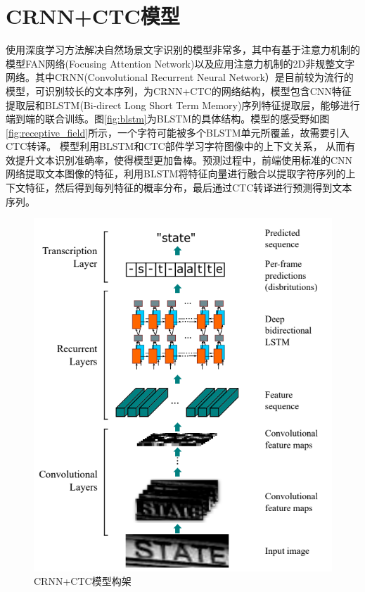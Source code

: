 \documentclass[12pt,a4paper]{ctexart}
\begin{document}
\section{CRNN+CTC模型}
使用深度学习方法解决自然场景文字识别的模型非常多，其中有基于注意力机制的模型FAN网络(Focusing Attention Network)\cite{FAN}以及应用注意力机制的2D非规整文字网络\cite{2D-ATTN}。其中CRNN(Convolutional Recurrent Neural Network）\cite{CRNN}是目前较为流行的模型，可识别较长的文本序列，为CRNN+CTC的网络结构，模型包含CNN特征提取层和BLSTM(Bi-direct Long Short Term Memory)\cite{BLSTM}序列特征提取层，能够进行端到端的联合训练。图\ref{fig:blstm}为BLSTM的具体结构。模型的感受野如图\ref{fig:receptive_field}所示，一个字符可能被多个BLSTM单元所覆盖，故需要引入CTC转译。 模型利用BLSTM和CTC\cite{Graves:2006:CTC:1143844.1143891}部件学习字符图像中的上下文关系， 从而有效提升文本识别准确率，使得模型更加鲁棒。预测过程中，前端使用标准的CNN网络提取文本图像的特征，利用BLSTM将特征向量进行融合以提取字符序列的上下文特征，然后得到每列特征的概率分布，最后通过CTC转译进行预测得到文本序列。
\begin{figure}
	\centering
	\includegraphics[width=0.7\linewidth]{images/crnn_ctc}
	\caption{CRNN+CTC模型构架}
	\label{fig:crnn_ctc}
\end{figure}
\end{document}
